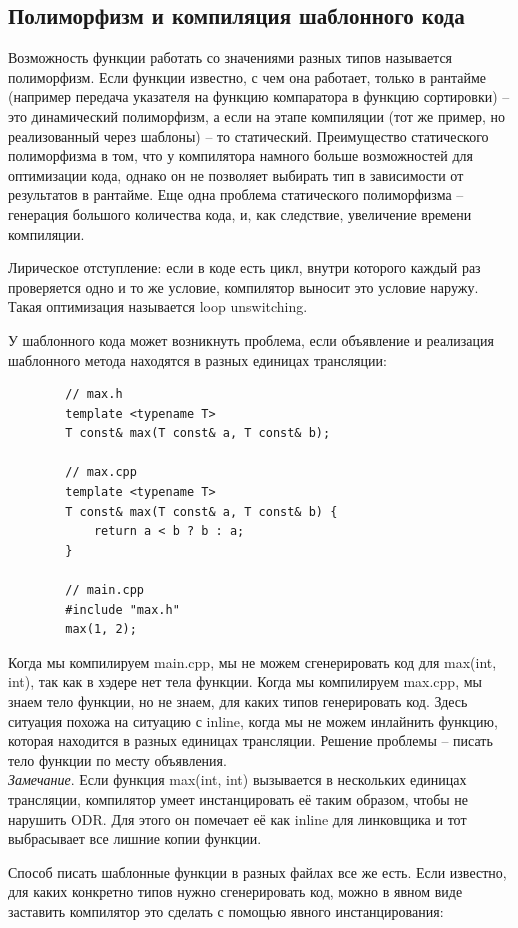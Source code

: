 \documentclass[12pt, a4paper]{article}
\begin{document}
	\subsection{Полиморфизм и компиляция шаблонного кода}
	\par Возможность функции работать со значениями разных типов называется полиморфизм. Если функции известно, с чем она работает, только в рантайме (например передача указателя на функцию компаратора в функцию сортировки) -- это динамический полиморфизм, а если на этапе компиляции (тот же пример, но реализованный через шаблоны) -- то статический. Преимущество статического полиморфизма в том, что у компилятора намного больше возможностей для оптимизации кода, однако он не позволяет выбирать тип в зависимости от результатов в рантайме. Еще одна проблема статического полиморфизма -- генерация большого количества кода, и, как следствие, увеличение времени компиляции.
	\par Лирическое отступление: если в коде есть цикл, внутри которого каждый раз проверяется одно и то же условие, компилятор выносит это условие наружу. Такая оптимизация называется loop unswitching.\\\par
	У шаблонного кода может возникнуть проблема, если объявление и реализация шаблонного метода находятся в разных единицах трансляции:
	\begin{verbatim}
		// max.h
		template <typename T>
		T const& max(T const& a, T const& b);
		
		// max.cpp
		template <typename T>
		T const& max(T const& a, T const& b) {
			return a < b ? b : a;
		}
		
		// main.cpp
		#include "max.h"
		max(1, 2);
	\end{verbatim}
	Когда мы компилируем main.cpp, мы не можем сгенерировать код для max(int, int), так как в хэдере нет тела функции. Когда мы компилируем max.cpp, мы знаем тело функции, но не знаем, для каких типов генерировать код. Здесь ситуация похожа на ситуацию с inline, когда мы не можем инлайнить функцию, которая находится в разных единицах трансляции. Решение проблемы -- писать тело функции по месту объявления.\\
	\textit{Замечание}. Если функция max(int, int) вызывается в нескольких единицах трансляции, компилятор умеет инстанцировать её таким образом, чтобы не нарушить ODR. Для этого он помечает её как inline для линковщика и тот выбрасывает все лишние копии функции.
	\par Способ писать шаблонные функции в разных файлах все же есть. Если известно, для каких конкретно типов нужно сгенерировать код, можно в явном виде заставить компилятор это сделать с помощью явного инстанцирования:
\end{document}
